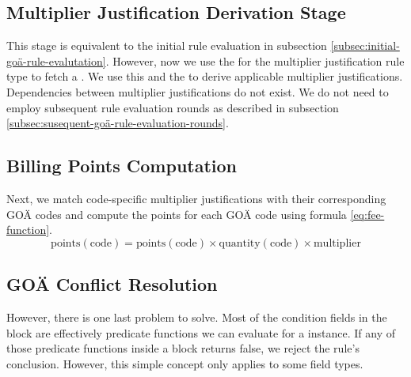 \subsection{Multiplier Justification Derivation Stage}\label{subsec:multiplier-justification-derivation-stage}
This stage is equivalent to the initial rule evaluation in subsection \ref{subsec:initial-goä-rule-evalutation}.
However, now we use the \REIF for the multiplier justification rule type to fetch a \REI.
We use this \REI and the  to derive applicable multiplier justifications.
Dependencies between multiplier justifications do not exist.
We do not need to employ subsequent rule evaluation rounds as described in subsection \ref{subsec:susequent-goä-rule-evaluation-rounds}.

\subsection{Billing Points Computation}\label{subsec:fee-computation}
Next, we match code-specific multiplier justifications with their corresponding GOÄ codes and compute the points for each GOÄ code using formula \ref{eq:fee-function}.
\begin{equation}\label{eq:fee-function}
    \text{points}\left(\text{code}\right) = \text{points}\left(\text{code}\right) \times \text{quantity}\left(\text{code}\right) \times \text{multiplier}
\end{equation}

\subsection{GOÄ Conflict Resolution}\label{subsec:goä-conflict-resolution}
However, there is one last problem to solve.
Most of the condition fields in the  block are effectively predicate functions we can evaluate for a \REI instance.
If any of those predicate functions inside a  block returns false, we reject the rule's conclusion.
However, this simple concept only applies to some field types.

